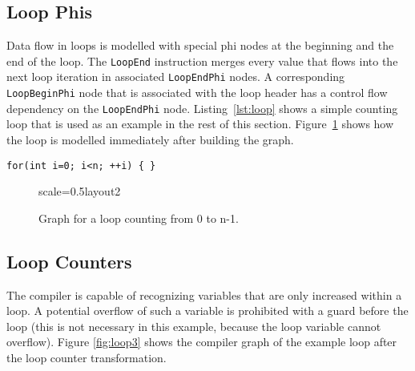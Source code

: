 \documentclass[twocolumn]{svjour3}
\newcommand\nodename[1]{\texttt{#1}}
\begin{document}
\subsection{Loop Phis}
Data flow in loops is modelled with special phi nodes at the beginning and the end of the loop.
The \nodename{LoopEnd} instruction merges every value that flows into the next loop iteration in associated \nodename{LoopEndPhi} nodes.
A corresponding \nodename{LoopBeginPhi} node that is associated with the loop header has a control flow dependency on the \nodename{LoopEndPhi} node.
Listing~\ref{lst:loop} shows a simple counting loop that is used as an example in the rest of this section.
Figure~\ref{fig:loop2} shows how the loop is modelled immediately after building the graph.

\begin{lstlisting}[label=lst:loop, caption=Loop example that counts from 0 to n-1., captionpos=b]
for(int i=0; i<n; ++i) { }
\end{lstlisting}

\begin{figure}[h]
  \centering
\begin{digraphenv}{scale=0.5}{layout2}
\end{digraphenv}
  \caption{Graph for a loop counting from 0 to n-1.}
  \label{fig:loop2}
\end{figure}

\subsection{Loop Counters}
The compiler is capable of recognizing variables that are only increased within a loop.
A potential overflow of such a variable is prohibited with a guard before the loop (this is not necessary in this example, because the loop variable cannot overflow).
Figure \ref{fig:loop3} shows the compiler graph of the example loop after the loop counter transformation.
\end{document}
